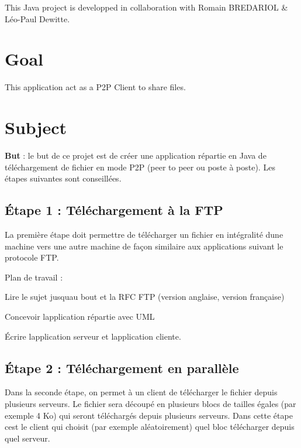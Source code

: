This Java project is developped in collaboration with Romain B\+R\+E\+D\+A\+R\+I\+OL \& Léo-\/\+Paul Dewitte.

\section*{Goal}

This application act as a P2P Client to share files.

\section*{Subject}

{\bfseries But} \+: le but de ce projet est de créer une application répartie en Java de téléchargement de fichier en mode P2P (peer to peer ou poste à poste). Les étapes suivantes sont conseillées. \subsection*{Étape 1 \+: Téléchargement à la F\+TP}

La première étape doit permettre de télécharger un fichier en intégralité d\textquotesingle{}une machine vers une autre machine de façon similaire aux applications suivant le protocole F\+TP.

Plan de travail \+:


\begin{DoxyItemize}
\item Lire le sujet jusqu\textquotesingle{}au bout et la R\+FC F\+TP (version anglaise, version française)
\item Concevoir l\textquotesingle{}application répartie avec U\+ML
\item Écrire l\textquotesingle{}application serveur et l\textquotesingle{}application cliente.
\end{DoxyItemize}

\subsection*{Étape 2 \+: Téléchargement en parallèle}

Dans la seconde étape, on permet à un client de télécharger le fichier depuis plusieurs serveurs. Le fichier sera découpé en plusieurs blocs de tailles égales (par exemple 4 Ko) qui seront téléchargés depuis plusieurs serveurs. Dans cette étape c\textquotesingle{}est le client qui choisit (par exemple aléatoirement) quel bloc télécharger depuis quel serveur.

